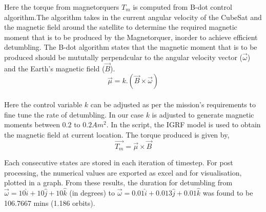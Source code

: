 \documentclass[11pt]{report}
\begin{document}
	Here the torque from magnetorquers $T_m$ is computed from B-dot control algorithm.The algorithm takes in the current angular velocity of the CubeSat and the magnetic field around the satellite to determine the required magnetic moment that is to be produced by the Magnetorquer, inorder to achieve efficient detumbling. The B-dot algorithm states that the magnetic moment that is to be produced should be mututally perpendcular to the angular velocity vector ($\vec{\omega}$) and the Earth's magnetic field ($\vec{B}$).\\
	$$\vec{\mu} = k.\left(\vec{B}\times\vec{\omega}\right)$$\\
	Here the control variable $k$ can be adjusted as per the mission's requirements to fine tune the rate of detumbling. In our case $k$ is adjusted to generate magnetic moments between $0.2\text{ to }0.2Am^2$. In the script, the IGRF model is used to obtain the magnetic field at current location. The torque produced is given by, $$\vec{T_m} = \vec{\mu}\times\vec{B}$$
	
	Each consecutive states are stored in each iteration of timestep. For post processing, the numerical values are exported as excel and for visualisation, plotted in a graph. From these results, the duration for detumbling from $\vec{\omega}=10\hat{i}+10\hat{j}+10\hat{k}$ (in degrees) to $\vec{\omega}=0.01\hat{i}+0.013\hat{j}+0.01\hat{k}$ was found to be 106.7667 mins (1.186 orbits).
	
	
	
\end{document}
